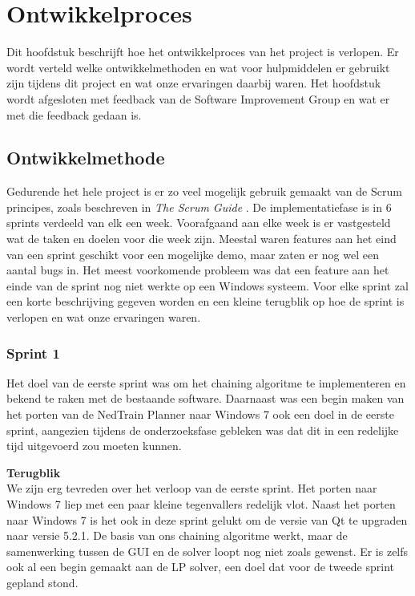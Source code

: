 \section{Ontwikkelproces}
Dit hoofdstuk beschrijft hoe het ontwikkelproces van het project is verlopen. Er wordt verteld welke ontwikkelmethoden en wat voor hulpmiddelen er gebruikt zijn tijdens dit project en wat onze ervaringen daarbij waren. Het hoofdstuk wordt afgesloten met feedback van de Software Improvement Group en wat er met die feedback gedaan is. 

\subsection{Ontwikkelmethode}
Gedurende het hele project is er zo veel mogelijk gebruik gemaakt van de Scrum principes, zoals beschreven in \emph{The Scrum Guide} \cite{schwaber2011}. De implementatiefase is in 6 sprints verdeeld van elk een week. Voorafgaand aan elke week is er vastgesteld wat de taken en doelen voor die week zijn.  Meestal waren features aan het eind van een sprint geschikt voor een mogelijke demo, maar zaten er nog wel een aantal bugs in. Het meest voorkomende probleem was dat een feature aan het einde van de sprint nog niet werkte op een Windows systeem. Voor elke sprint zal een korte beschrijving gegeven worden en een kleine terugblik op hoe de sprint is verlopen en wat onze ervaringen waren.

\subsubsection{Sprint 1}
Het doel van de eerste sprint was om het chaining algoritme te implementeren en bekend te raken met de bestaande software. Daarnaast was een begin maken van het porten van de NedTrain Planner naar Windows 7 ook een doel in de eerste sprint, aangezien tijdens de onderzoeksfase gebleken was dat dit in een redelijke tijd uitgevoerd zou moeten kunnen.

\textbf{Terugblik} \\
We zijn erg tevreden over het verloop van de eerste sprint. Het porten naar Windows 7 liep met een paar kleine tegenvallers redelijk vlot. Naast het porten naar Windows 7 is het ook in deze sprint gelukt om de versie van Qt te upgraden naar versie 5.2.1. De basis van ons chaining algoritme werkt, maar de samenwerking tussen de GUI en de solver loopt nog niet zoals gewenst. Er is zelfs ook al een begin gemaakt aan de LP solver, een doel dat voor de tweede sprint gepland stond. 

